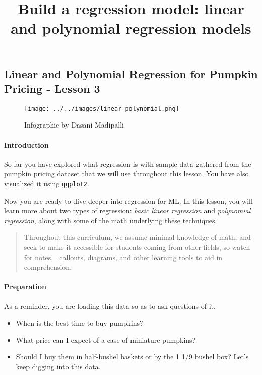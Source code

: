 \documentclass[
]{article}
\title{Build a regression model: linear and polynomial regression
models}
\author{}
\date{\vspace{-2.5em}}
\begin{document}
\maketitle

{
\setcounter{tocdepth}{2}
\tableofcontents
}
\hypertarget{linear-and-polynomial-regression-for-pumpkin-pricing---lesson-3}{%
\subsection{Linear and Polynomial Regression for Pumpkin Pricing -
Lesson
3}\label{linear-and-polynomial-regression-for-pumpkin-pricing---lesson-3}}

\begin{figure}
\centering
\texttt{[image: ../../images/linear-polynomial.png]}
\caption{Infographic by Dasani Madipalli}
\end{figure}

\hypertarget{introduction}{%
\paragraph{Introduction}\label{introduction}}

So far you have explored what regression is with sample data gathered
from the pumpkin pricing dataset that we will use throughout this
lesson. You have also visualized it using \texttt{ggplot2}.💪

Now you are ready to dive deeper into regression for ML. In this lesson,
you will learn more about two types of regression: \emph{basic linear
regression} and \emph{polynomial regression}, along with some of the
math underlying these techniques.

\begin{quote}
Throughout this curriculum, we assume minimal knowledge of math, and
seek to make it accessible for students coming from other fields, so
watch for notes, 🧮 callouts, diagrams, and other learning tools to aid
in comprehension.
\end{quote}

\hypertarget{preparation}{%
\paragraph{Preparation}\label{preparation}}

As a reminder, you are loading this data so as to ask questions of it.

\begin{itemize}
\item
  When is the best time to buy pumpkins?
\item
  What price can I expect of a case of miniature pumpkins?
\item
  Should I buy them in half-bushel baskets or by the 1 1/9 bushel box?
  Let's keep digging into this data.
\end{itemize}
\end{document}
